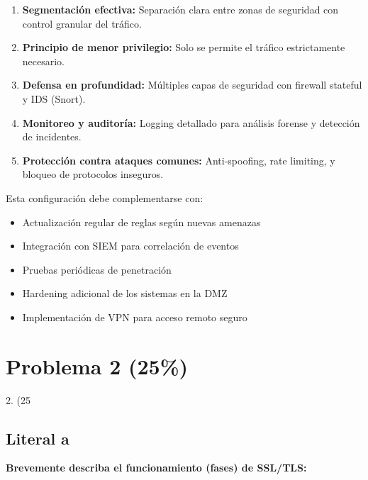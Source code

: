 {\begin{enumerate}
    \item \textbf{Segmentación efectiva:} Separación clara entre zonas de seguridad con control granular del tráfico.
    \item \textbf{Principio de menor privilegio:} Solo se permite el tráfico estrictamente necesario.
    \item \textbf{Defensa en profundidad:} Múltiples capas de seguridad con firewall stateful y IDS (Snort).
    \item \textbf{Monitoreo y auditoría:} Logging detallado para análisis forense y detección de incidentes.
    \item \textbf{Protección contra ataques comunes:} Anti-spoofing, rate limiting, y bloqueo de protocolos inseguros.
\end{enumerate}

Esta configuración debe complementarse con:
\begin{itemize}
    \item Actualización regular de reglas según nuevas amenazas
    \item Integración con SIEM para correlación de eventos
    \item Pruebas periódicas de penetración
    \item Hardening adicional de los sistemas en la DMZ
    \item Implementación de VPN para acceso remoto seguro
\end{itemize}



\section{Problema 2 (25\%)}

2. (25%
\subsection{Literal a}
\textbf{Brevemente describa el funcionamiento (fases) de SSL/TLS:}



}

